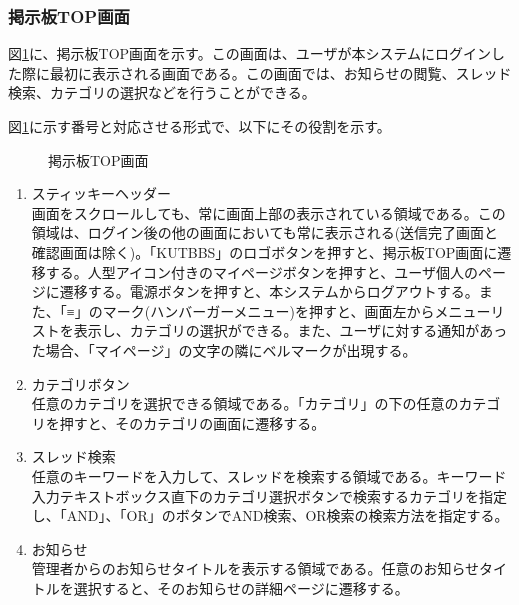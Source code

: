\documentclass[a4j]{jarticle}
\begin{document}
\subsubsection{掲示板TOP画面}
図\ref{fig:BBS_top}に、掲示板TOP画面を示す。この画面は、ユーザが本システムにログインした際に最初に表示される画面である。この画面では、お知らせの閲覧、スレッド検索、カテゴリの選択などを行うことができる。

図\ref{fig:BBS_top}に示す番号と対応させる形式で、以下にその役割を示す。
\begin{figure}[H]
\centering
{}
\caption{掲示板TOP画面}
\label{fig:BBS_top}
\end{figure}
\begin{enumerate}
  \renewcommand{\labelenumi}{\textcircled{\scriptsize \theenumi}}
  \item スティッキーヘッダー\\
  画面をスクロールしても、常に画面上部の表示されている領域である。この領域は、ログイン後の他の画面においても常に表示される(送信完了画面と確認画面は除く)。「KUTBBS」のロゴボタンを押すと、掲示板TOP画面に遷移する。人型アイコン付きのマイページボタンを押すと、ユーザ個人のページに遷移する。電源ボタンを押すと、本システムからログアウトする。また、「≡」のマーク(ハンバーガーメニュー)を押すと、画面左からメニューリストを表示し、カテゴリの選択ができる。また、ユーザに対する通知があった場合、「マイページ」の文字の隣にベルマークが出現する。
  \item カテゴリボタン\\
  任意のカテゴリを選択できる領域である。「カテゴリ」の下の任意のカテゴリを押すと、そのカテゴリの画面に遷移する。
  \item スレッド検索\\
  任意のキーワードを入力して、スレッドを検索する領域である。キーワード入力テキストボックス直下のカテゴリ選択ボタンで検索するカテゴリを指定し、「AND」、「OR」のボタンでAND検索、OR検索の検索方法を指定する。
  \item お知らせ\\
  管理者からのお知らせタイトルを表示する領域である。任意のお知らせタイトルを選択すると、そのお知らせの詳細ページに遷移する。
\end{enumerate}
\end{document}
